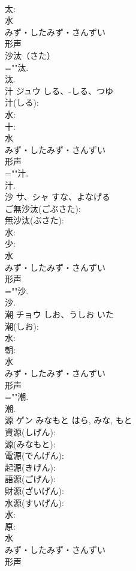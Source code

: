 \documentclass[8pt]{extreport}
\begin{document}
\begin{CJK}{UTF8}{min}
\\	太: 
\\	水	
\\	みず・したみず・さんずい	
\\	形声 
\\	沙汰（さた）
\\	=""汰.
\\	汰.
\\	汁	ジュウ	しる、-しる、つゆ		
\\	汁(しる): 
\\	水: 
\\	十: 
\\	水	
\\	みず・したみず・さんずい	
\\	形声 
\\	=""汁.
\\	汁.
\\	沙	サ、シャ	すな、よなげる		
\\	ご無沙汰(ごぶさた): 
\\	無沙汰(ぶさた): 
\\	水: 
\\	少: 
\\	水	
\\	みず・したみず・さんずい	
\\	形声 
\\	=""沙.
\\	沙.
\\	潮	チョウ	しお、うしお	いた	
\\	潮(しお): 
\\	水: 
\\	朝: 
\\	水	
\\	みず・したみず・さんずい	
\\	形声 
\\	=""潮.
\\	潮.
\\	源	ゲン	みなもと	はら, みな, もと	
\\	資源(しげん): 
\\	源(みなもと): 
\\	電源(でんげん): 
\\	起源(きげん): 
\\	語源(ごげん): 
\\	財源(ざいげん): 
\\	水源(すいげん): 
\\	水: 
\\	原: 
\\	水	
\\	みず・したみず・さんずい	
\\	形声 

\end{CJK}
\end{document}
